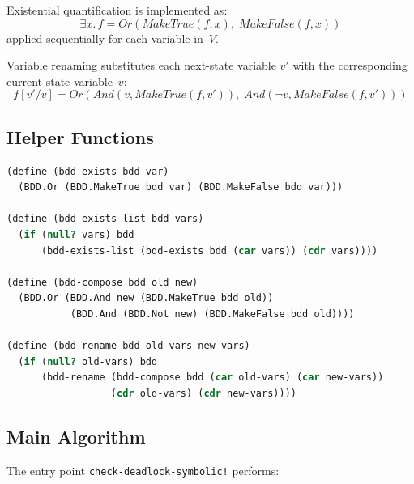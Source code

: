 \documentclass[11pt]{article}
\begin{document}
Existential quantification is implemented as:
\[
  \exists x.\, f = \mathit{Or}(\mathit{MakeTrue}(f, x),\; \mathit{MakeFalse}(f, x))
\]
applied sequentially for each variable in~$V$.

Variable renaming substitutes each next-state variable $v'$ with the
corresponding current-state variable~$v$:
\[
  f[v'/v] = \mathit{Or}(\mathit{And}(v, \mathit{MakeTrue}(f, v')),\;
                         \mathit{And}(\neg v, \mathit{MakeFalse}(f, v')))
\]

\subsection{Helper Functions}

\begin{lstlisting}[language=scheme]
(define (bdd-exists bdd var)
  (BDD.Or (BDD.MakeTrue bdd var) (BDD.MakeFalse bdd var)))

(define (bdd-exists-list bdd vars)
  (if (null? vars) bdd
      (bdd-exists-list (bdd-exists bdd (car vars)) (cdr vars))))

(define (bdd-compose bdd old new)
  (BDD.Or (BDD.And new (BDD.MakeTrue bdd old))
           (BDD.And (BDD.Not new) (BDD.MakeFalse bdd old))))

(define (bdd-rename bdd old-vars new-vars)
  (if (null? old-vars) bdd
      (bdd-rename (bdd-compose bdd (car old-vars) (car new-vars))
                  (cdr old-vars) (cdr new-vars))))
\end{lstlisting}

\subsection{Main Algorithm}

The entry point \texttt{check-deadlock-symbolic!} performs:
\end{document}
